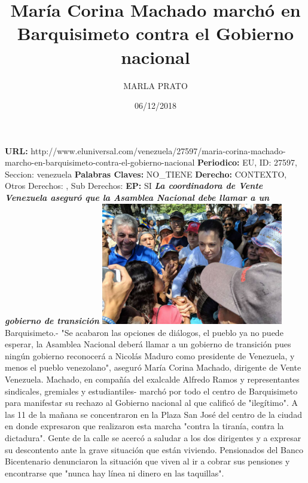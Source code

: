 \documentclass{article}%
\title{\textbf{María Corina Machado marchó en Barquisimeto contra el Gobierno nacional}}%
\author{MARLA PRATO}%
\date{06/12/2018}%
\begin{document}
%
\normalsize%
\maketitle%
\textbf{URL: }%
http://www.eluniversal.com/venezuela/27597/maria{-}corina{-}machado{-}marcho{-}en{-}barquisimeto{-}contra{-}el{-}gobierno{-}nacional\newline%
%
\textbf{Periodico: }%
EU, %
ID: %
27597, %
Seccion: %
venezuela\newline%
%
\textbf{Palabras Claves: }%
NO\_TIENE\newline%
%
\textbf{Derecho: }%
CONTEXTO, %
Otros Derechos: %
, %
Sub Derechos: %
\newline%
%
\textbf{EP: }%
SI\newline%
\newline%
%
\textbf{\textit{La coordinadora de Vente Venezuela aseguró que la Asamblea Nacional debe llamar a un gobierno de transición}}%
\newline%
\newline%
%
\includegraphics[width=300px]{226.jpeg}%
\newline%
%
Barquisimeto.{-} "Se acabaron las opciones de diálogos, el pueblo ya no puede esperar, la Asamblea Nacional deberá llamar a un gobierno de transición pues ningún gobierno reconocerá a Nicolás Maduro como presidente de Venezuela, y menos el pueblo venezolano", aseguró María Corina Machado, dirigente de Vente Venezuela.%
\newline%
%
Machado, en compañía del exalcalde Alfredo Ramos y representantes sindicales, gremiales y estudiantiles{-} marchó por todo el centro de Barquisimeto para manifestar su rechazo al Gobierno nacional al que calificó de "ilegítimo".%
\newline%
%
A las 11 de la mañana se concentraron en la Plaza San José del centro de la ciudad en donde expresaron que realizaron esta marcha "contra la tiranía, contra la dictadura".%
\newline%
%
Gente de la calle se acercó a saludar a los dos dirigentes y a expresar su descontento ante la grave situación que están viviendo. Pensionados del Banco Bicentenario denunciaron la situación que viven al ir a cobrar sus pensiones y encontrarse que "nunca hay línea ni dinero en las taquillas".%
\end{document}
